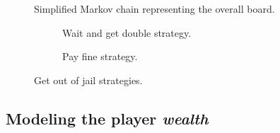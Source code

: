 

\newpage
\begin{figure}[H]
  \begin{center}
    
  \end{center}
  \caption{Simplified Markov chain representing the overall board.}
  \label{fig:markov_monop}
\end{figure}

\begin{figure}[H] %
    \begin{subfigure}[b]{0.5\textwidth}
      
      \caption{Wait and get double strategy.}
      \label{fig:jail_double}
    \end{subfigure}
    \hspace{3cm}
    \begin{subfigure}[b]{0.24\textwidth}
      
      \caption{Pay fine strategy.}
      \label{fig:jail_pay}
    \end{subfigure}
  \caption{Get out of jail strategies.}
\end{figure}

\newpage


\subsection{Modeling the player \emph{wealth}} %
\label{sub:modeling_the_player_emph_wealth}


